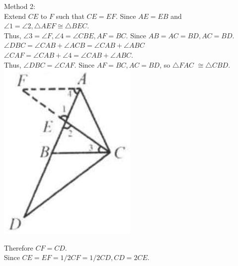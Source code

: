 \documentclass{article}
\begin{document}
Method 2:\\
Extend \(C E\) to \(F\) such that \(C E=E F\). Since \(A E=E B\) and \(\angle 1=\angle 2, \triangle A E F \cong \triangle B E C\).\\
Thus, \(\angle 3=\angle F, \angle 4=\angle C B E, A F=B C\). Since \(A B=A C=B D, A C=B D\).\\
\(\angle D B C=\angle C A B+\angle A C B=\angle C A B+\angle A B C\)\\
\(\angle C A F=\angle C A B+\angle 4=\angle C A B+\angle A B C\).\\
Thus, \(\angle D B C=\angle C A F\). Since \(A F=B C, A C=B D\), so \(\triangle F A C\) \(\cong \triangle C B D\).\\
\centering
\includegraphics[width=\textwidth]{images/030(2).jpg}

Therefore \(C F=C D\).\\
Since \(C E=E F=1 / 2 C F=1 / 2 C D, C D=2 C E\).
\end{document}
